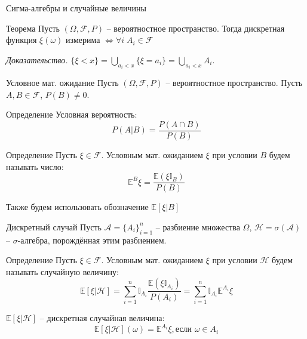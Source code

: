 \documentclass{beamer}
\begin{document}
\begin{frame}{Сигма-алгебры и случайные величины}
    \begin{block}{Теорема}
        Пусть $(\Omega, \mathcal{F} , P)$ -- вероятностное пространство. Тогда дискретная функция $\xi(\omega)$ измерима $\Longleftrightarrow \forall i \; A_i \in \mathcal{F}$
    \end{block}
    \textit{Доказательство.}
    $\{ \xi < x \} = \bigcup\limits_{a_i < x} \{ \xi = a_i\} = \bigcup\limits_{a_i < x} A_i$.
\end{frame}


\begin{frame}{Условное мат. ожидание}
    Пусть $\left( \Omega, \mathcal{F} , P\right)$ -- вероятностное пространство. Пусть $A, B \in \mathcal{F} $, $P(B) \neq 0$. 
    \begin{block}{Определение}
        Условная вероятность: 
        $$
            P(A|B) = \dfrac{P(A\cap B)}{P(B)}
        $$
    \end{block}

    \begin{block}{Определение}
        Пусть $\xi \in \mathcal{F}$. Условным мат. ожиданием $\xi$ при условии $B$ будем называть число:
        $$\mathbb{E}^B \xi = \dfrac{\mathbb{E} \left(\xi \mathbb{I}_{B}\right)}{P(B)}$$
    \end{block}
    Также будем использовать обозначение $\mathbb{E}\left[ \xi | B \right]$
\end{frame}

\begin{frame}{Дискретный случай}
    Пусть $\mathcal{A} = \{A_i\}_{i=1}^n$ -- разбиение множества $\Omega$, $\mathcal{H} = \sigma(\mathcal{A})$ -- $\sigma$-алгебра, порождённая этим разбиением.

    \begin{block}{Определение}
        Пусть $\xi \in \mathcal{F}$. Условным мат. ожиданием $\xi$ при условии $\mathcal{H}$ будем называть случайную величину:
        $$\mathbb{E}\left[ \xi | \mathcal{H} \right] = \sum_{i=1}^n \mathbb{I}_{A_i} \dfrac{\mathbb{E} \left(\xi \mathbb{I}_{A_i}\right)}{P(A_i)} = 
        \sum_{i=1}^n \mathbb{I}_{A_i} \mathbb{E}^{A_i}\xi$$
    \end{block}
    $\mathbb{E}\left[ \xi | \mathcal{H} \right]$ -- дискретная случайная величина:
    $$
        \mathbb{E}\left[ \xi | \mathcal{H} \right](\omega) = \mathbb{E}^{A_i} \xi, \text{если } \omega \in A_i
    $$

\end{frame}
\end{document}
